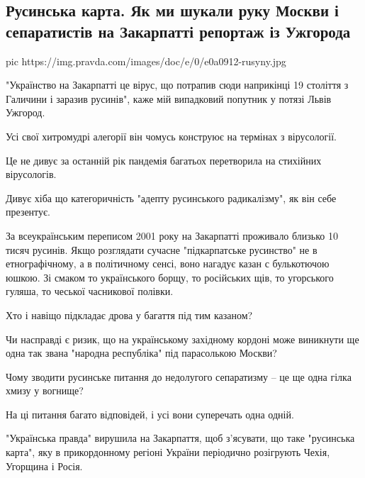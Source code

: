  
 
 

\subsection{Русинська карта. Як ми шукали руку Москви і сепаратистів на Закарпатті \textemdash репортаж із Ужгорода}


\ifcmt
pic https://img.pravda.com/images/doc/e/0/e0a0912-rusyny.jpg
\fi

"Українство на Закарпатті \textemdash це вірус, що потрапив сюди наприкінці 19 століття з
Галичини і заразив русинів", \textemdash каже мій випадковий попутник у потязі Львів \textemdash
Ужгород.

Усі свої хитромудрі алегорії він чомусь конструює на термінах з вірусології.

Це не дивує \textemdash за останній рік пандемія багатьох перетворила на стихійних
вірусологів.

Дивує хіба що категоричність "адепту русинського радикалізму", як він себе
презентує.

За всеукраїнським переписом 2001 року на Закарпатті проживало близько 10 тисяч
русинів. Якщо розглядати сучасне "підкарпатське русинство" не в етнографічному,
а в політичному сенсі, воно нагадує казан с булькотючою юшкою. Зі смаком то
українського борщу, то російських щів, то угорського гуляша, то чеської
часникової полівки.

Хто і навіщо підкладає дрова у багаття під тим казаном?

Чи насправді є ризик, що на українському західному кордоні може виникнути ще
одна так звана "народна республіка" під парасолькою Москви?

Чому зводити русинське питання до недолугого сепаратизму – це ще одна гілка
хмизу у вогнище?

На ці питання багато відповідей, і усі вони суперечать одна одній.

"Українська правда" вирушила на Закарпаття, щоб з’ясувати, що таке "русинська
карта", яку в прикордонному регіоні України періодично розігрують Чехія,
Угорщина і Росія.

